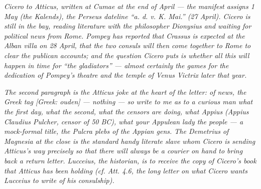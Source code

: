 
\textit{Cicero to Atticus, written at Cumae at the end of
April --- the manifest assigns 1 May (the Kalends), the
Perseus dateline ``a. d. v. K. Mai.'' (27 April). Cicero is
still in the bay, reading literature with the philosopher
Dionysius and waiting for political news from Rome. Pompey
has reported that Crassus is expected at the Alban villa on
28 April, that the two consuls will then come together to
Rome to clear the publican accounts; and the question Cicero
puts is whether all this will happen in time for ``the
gladiators'' --- almost certainly the games for the dedication
of Pompey's theatre and the temple of Venus Victrix later
that year.}

\textit{The second paragraph is the Atticus joke at the heart
of the letter: of news, the Greek tag \textit{[Greek:
ouden]} --- nothing --- so write to me as to a curious man
what the first day, what the second, what the censors are
doing, what Appius (Appius Claudius Pulcher, censor of 50
BC), what \textit{your Appulean lady the people} --- a
mock-formal title, the Pulcra plebs of the Appian gens. The
Demetrius of Magnesia at the close is the standard handy
literate slave whom Cicero is sending Atticus's way precisely
so that there will always be a courier on hand to bring back
a return letter. Lucceius, the historian, is to receive the
copy of Cicero's book that Atticus has been holding (cf.
\textit{Att.} 4.6, the long letter on what Cicero wants
Lucceius to write of his consulship).}
